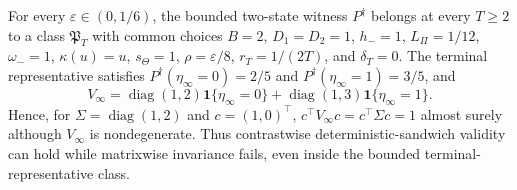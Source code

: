 For every \(\varepsilon\in(0,1/6)\), the bounded two-state witness \(P^{\dagger}\) belongs at every \(T\ge2\) to a class \(\mathfrak P_T\) with common choices \(B=2\), \(D_1=D_2=1\), \(h_-=1\), \(L_\Pi=1/12\), \(\omega_-=1\), \(\kappa(u)=u\), \(s_\Theta=1\), \(\rho=\varepsilon/8\), \(r_T=1/(2T)\), and \(\delta_T=0\). The terminal representative satisfies \(P^{\dagger}(\eta_\infty=0)=2/5\) and \(P^{\dagger}(\eta_\infty=1)=3/5\), and
\[
 V_\infty=\operatorname{diag}(1,2)\mathbf1\{\eta_\infty=0\}
 +\operatorname{diag}(1,3)\mathbf1\{\eta_\infty=1\}.
\]
Hence, for \(\Sigma=\operatorname{diag}(1,2)\) and \(c=(1,0)^\top\), \(c^\top V_\infty c=c^\top\Sigma c=1\) almost surely although \(V_\infty\) is nondegenerate. Thus contrastwise deterministic-sandwich validity can hold while matrixwise invariance fails, even inside the bounded terminal-representative class.